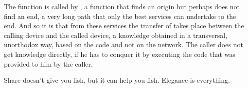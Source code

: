 \documentclass[a4paper,10pt,english,openany,oneside]{sphinxmanual}
\begin{document}
The  function is called by , a function that finds an origin but perhaps does not find an end, a very long path that
only the best services can undertake to the end. And so it is that from these services the transfer of  takes place between the
calling device and the called device, a knowledge obtained in a transversal, unorthodox way, based on the code and not on the network.
The caller does not get knowledge directly, if he has to conquer it by executing the code that was provided to him by the caller.

Share doesn’t give you fish, but it can help you fish. Elegance is everything.
\end{document}
